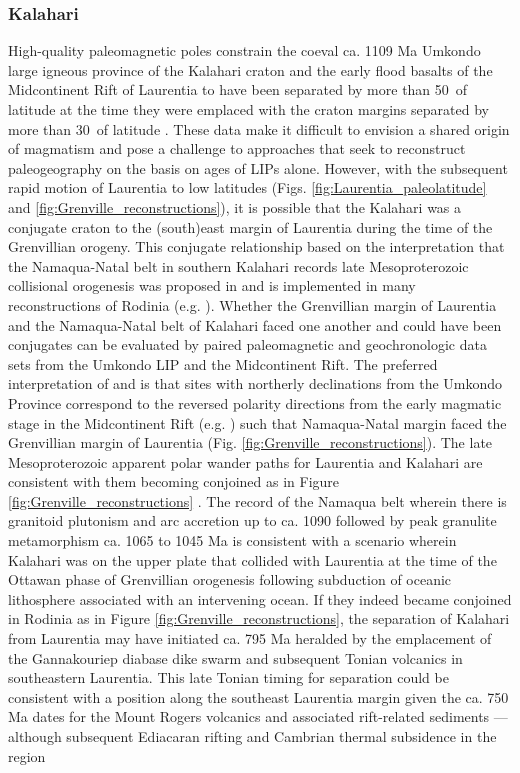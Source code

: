 \documentclass[twocolumn, switch]{article} %
\begin{document}
\subsubsection{Kalahari}

High-quality paleomagnetic poles constrain the coeval ca. 1109 Ma Umkondo large igneous province of the Kalahari craton and the early flood basalts of the Midcontinent Rift of Laurentia to have been separated by more than 50\textdegree\ of latitude at the time they were emplaced with the craton margins separated by more than 30\textdegree\ of latitude \citep{Swanson-Hysell2015a}. These data make it difficult to envision a shared origin of magmatism and pose a challenge to approaches that seek to reconstruct paleogeography on the basis on ages of LIPs alone. However, with the subsequent rapid motion of Laurentia to low latitudes (Figs. \ref{fig:Laurentia_paleolatitude} and \ref{fig:Grenville_reconstructions}), it is possible that the Kalahari was a conjugate craton to the (south)east margin of Laurentia during the time of the Grenvillian orogeny. This conjugate relationship based on the interpretation that the Namaqua-Natal belt in southern Kalahari records late Mesoproterozoic collisional orogenesis was  proposed in \cite{Hoffman1991a} and is implemented in many reconstructions of Rodinia (e.g. \citealp{Li2008a}). Whether the Grenvillian margin of Laurentia and the Namaqua-Natal belt of Kalahari faced one another and could have been conjugates can be evaluated by paired paleomagnetic and geochronologic data sets from the Umkondo LIP and the Midcontinent Rift. The preferred interpretation of \cite{Swanson-Hysell2015a} and \cite{Kasbohm2015a} is that sites with northerly declinations from the Umkondo Province correspond to the reversed polarity directions from the early magmatic stage in the Midcontinent Rift (e.g. \citealp{Swanson-Hysell2014a}) such that Namaqua-Natal margin faced the Grenvillian margin of Laurentia (Fig. \ref{fig:Grenville_reconstructions}). The late Mesoproterozoic apparent polar wander paths for Laurentia and Kalahari are consistent with them becoming conjoined as in Figure \ref{fig:Grenville_reconstructions} \citep{Swanson-Hysell2015a}. The record of the Namaqua belt wherein there is granitoid plutonism and arc accretion up to ca. 1090 followed by peak granulite metamorphism ca. 1065 to 1045 Ma \citep{Diener2013a, Spencer2015a} is consistent with a scenario wherein Kalahari was on the upper plate that collided with Laurentia at the time of the Ottawan phase of Grenvillian orogenesis following subduction of oceanic lithosphere associated with an intervening ocean. If they indeed became conjoined in Rodinia as in Figure \ref{fig:Grenville_reconstructions}, the separation of Kalahari from Laurentia may have initiated ca. 795 Ma heralded by the emplacement of the Gannakouriep diabase dike swarm \citep{Rioux2010a, DeKock2021a} and subsequent Tonian volcanics in southeastern Laurentia. This late Tonian timing for separation could be  consistent with a position along the southeast Laurentia margin given the ca. 750 Ma dates for the Mount Rogers volcanics and associated rift-related sediments \citep{Aleinikoff1995a,MacLennan2020a} --- although subsequent Ediacaran rifting and Cambrian thermal subsidence in the region 
\end{document}
